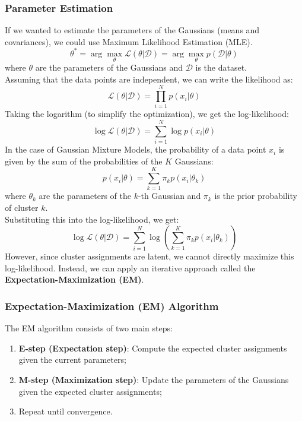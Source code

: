 \subsubsection*{Parameter Estimation}
If we wanted to estimate the parameters of the Gaussians (means and covariances), we could use Maximum Likelihood Estimation (MLE).
\[ \theta^* = \arg \max_{\theta} \mathcal{L}(\theta|\mathcal{D}) = \arg \max_{\theta} p(\mathcal{D} | \theta) \]
where $\theta$ are the parameters of the Gaussians and $\mathcal{D}$ is the dataset.
\\Assuming that the data points are independent, we can write the likelihood as:
\[ \mathcal{L}(\theta|\mathcal{D}) = \prod_{i = 1}^{N} p(x_i | \theta) \]
Taking the logarithm (to simplify the optimization), we get the log-likelihood:
\[ \log \mathcal{L}(\theta|\mathcal{D}) = \sum_{i=1}^{N} \log p(x_i | \theta) \]
In the case of Gaussian Mixture Models, the probability of a data point $x_i$ is given by 
the sum of the probabilities of the $K$ Gaussians:
\[ p(x_i | \theta) = \sum_{k = 1}^{K} \pi_k p(x_i | \theta_k) \]
where $\theta_k$ are the parameters of the $k$-th Gaussian and $\pi_k$ is the prior probability of cluster $k$.
\\Substituting this into the log-likelihood, we get:
\[ \log \mathcal{L}(\theta|\mathcal{D}) = \sum_{i=1}^{N} \log \left( \sum_{k = 1}^{K} \pi_k p(x_i | \theta_k) \right) \]
However, since cluster assignments are latent, we cannot directly maximize this log-likelihood.
Instead, we can apply an iterative approach called the \textbf{Expectation-Maximization (EM)}.

\subsubsection*{Expectation-Maximization (EM) Algorithm}
The EM algorithm consists of two main steps:
\begin{enumerate}
    \item \textbf{E-step (Expectation step)}: Compute the expected cluster assignments given the current parameters;
    \item \textbf{M-step (Maximization step)}: Update the parameters of the Gaussians given the expected cluster assignments;
    \item Repeat until convergence.
\end{enumerate}
